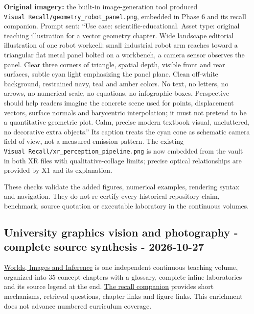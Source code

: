 \textbf{Original imagery:} the built-in image-generation tool produced \texttt{Visual\ Recall/geometry\_robot\_panel.png}, embedded in Phase 6 and its recall companion. Prompt sent: ``Use case: scientific-educational. Asset type: original teaching illustration for a vector geometry chapter. Wide landscape editorial illustration of one robot workcell: small industrial robot arm reaches toward a triangular flat metal panel bolted on a workbench, a camera sensor observes the panel. Clear three corners of triangle, spatial depth, visible front and rear surfaces, subtle cyan light emphasizing the panel plane. Clean off-white background, restrained navy, teal and amber colors. No text, no letters, no arrows, no numerical scale, no equations, no infographic boxes. Perspective should help readers imagine the concrete scene used for points, displacement vectors, surface normals and barycentric interpolation; it must not pretend to be a quantitative geometric plot. Calm, precise modern textbook visual, uncluttered, no decorative extra objects.'' Its caption treats the cyan cone as schematic camera field of view, not a measured emission pattern. The existing \texttt{Visual\ Recall/xr\_perception\_pipeline.png} is now embedded from the vault in both XR files with qualitative-collage limits; precise optical relationships are provided by X1 and its explanation.

These checks validate the added figures, numerical examples, rendering syntax and navigation. They do not re-certify every historical repository claim, benchmark, source quotation or executable laboratory in the continuous volumes.

\subsection{University graphics vision and photography - complete source synthesis - 2026-10-27}\label{appendix-a103e7846d21-university-graphics-vision-and-photography---complete-source-synthesis---2026-10-27}

\href{Continuous\%20Notes/University\%20-\%20Worlds,\%20Images\%20and\%20Inference\%20-\%20Graphics,\%20Vision\%20and\%20Photography}{Worlds, Images and Inference} is one independent continuous teaching volume, organized into 35 concept chapters with a glossary, complete inline laboratories and its source legend at the end. \hyperref[appendix-a8f634b076b5]{The recall companion} provides short mechanisms, retrieval questions, chapter links and figure links. This enrichment does not advance numbered curriculum coverage.

